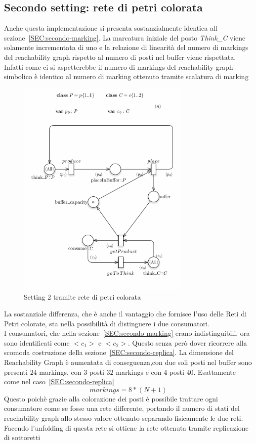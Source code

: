 \documentclass{article}
\begin{document}
\subsection{Secondo setting: rete di petri colorata}
Anche questa implementazione si presenta sostanzialmente identica all sezione~\ref{SEC:secondo-marking}.
La marcatura iniziale del posto \textit{Think\_C} viene solamente incrementata di uno e la relazione di linearità del numero di markings del reachability graph rispetto al numero di posti nel buffer viene rispettata.\\
Infatti come ci si aspetterebbe il numero di markings del reachability graph simbolico è identico al numero di marking ottenuto tramite scalatura di marking
\begin{figure}[!ht]
\centering
\includegraphics[width=0.75\textwidth]{./Esercizio2_img/setting_2_CPN.png}
\caption{Setting 2 tramite rete di petri colorata} \label{FIG:setting2_CPN}
\end{figure}
La sostanziale differenza, che è anche il vantaggio che fornisce l'uso delle Reti di Petri colorate, sta nella possibilità di distinguere i due consumatori.\\
I consumatori, che nella sezione~\ref{SEC:secondo-marking} erano indistinguibili, ora sono identificati come $<c_1>$ e $<c_2>$.
Questo senza però dover ricorrere alla scomoda costruzione della sezione~\ref{SEC:secondo-replica}.
La dimensione del Reachability Graph è aumentata di conseguenza,con due soli posti nel buffer sono presenti $24$ markings, con 3 posti $32$ markings e con 4 posti $40$. Esattamente come nel caso~\ref{SEC:secondo-replica}
$$markings = 8 * (N + 1)$$
Questo poichè grazie alla colorazione dei posti è possibile trattare ogni consumatore come se fosse una rete differente, portando il numero di stati del reachability graph allo stesso valore ottenuto separando fisicamente le due reti.
Facendo l'unfolding di questa rete si ottiene la rete ottenuta tramite replicazione di sottoretti
\end{document}
